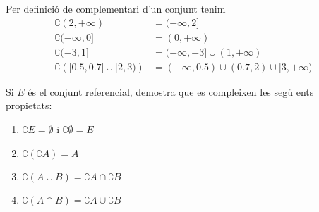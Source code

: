 \begin{solucio}
Per definici\'{o} de complementari d'un conjunt tenim%
\begin{align*}
\complement (2,+\infty )& =(-\infty ,2] \\
\complement (-\infty ,0]& =(0,+\infty ) \\
\complement (-3,1]& =(-\infty ,-3]\cup (1,+\infty ) \\
\complement \left( \lbrack 0.5,0.7]\cup \lbrack 2,3)\right) & =(-\infty
,0.5)\cup (0.7,2)\cup \lbrack 3,+\infty )
\end{align*}
\end{solucio}

\begin{exer}
Si $E$ \'{e}s el conjunt referencial, demostra que es compleixen les seg\"{u}%
ents propietats:

\begin{enumerate}
\item $\complement E=\emptyset $ i $\complement \emptyset =E$

\item $\complement \left( \complement A\right) =A$

\item $\complement \left( A\cup B\right) =\complement A\cap \complement B$

\item $\complement \left( A\cap B\right) =\complement A\cup \complement B$
\end{enumerate}
\end{exer}

